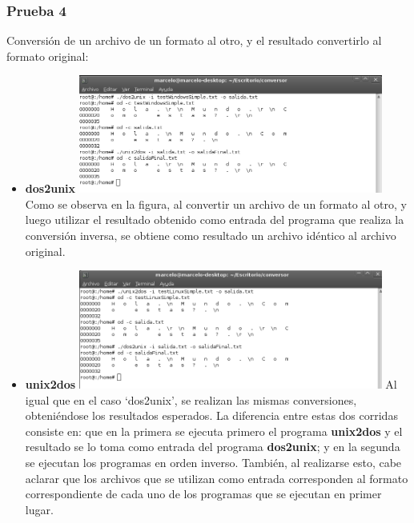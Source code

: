 \documentclass[a4paper,10pt]{article}
\begin{document}
    \subsubsection{Prueba 4}
    Conversi\'on de un archivo de un formato al otro, y el resultado convertirlo al formato original:
      \begin{itemize}
      \item \textbf{dos2unix}
      \newline
      \includegraphics[width=10cm, viewport=0 0 842 328]{../Informe/Imagenes/prueba4-archivo-dos2unix.png}	
      \newline
      Como se observa en la figura, al convertir un archivo de un formato al otro, y luego utilizar el resultado obtenido como
      entrada del programa que realiza la conversi\'on inversa, se obtiene como resultado un archivo id\'entico al archivo original.
      
      \item \textbf{unix2dos}
      \newline
      \includegraphics[width=10cm, viewport=0 0 838 328]{../Informe/Imagenes/prueba4-archivo-unix2dos.png}	
      \newline
      Al igual que en el caso `dos2unix', se realizan las mismas conversiones, obteni\'endose los resultados esperados. La diferencia
      entre estas dos corridas consiste en: que en la primera se ejecuta primero el programa {\bf unix2dos} y el resultado se lo toma como
      entrada del programa {\bf dos2unix}; y en la segunda se ejecutan los programas en orden inverso. Tambi\'en, al realizarse esto, cabe aclarar
      que los archivos que se utilizan como entrada corresponden al formato correspondiente de cada uno de los programas que se ejecutan en primer
      lugar.
      
      \end{itemize}
\end{document}

